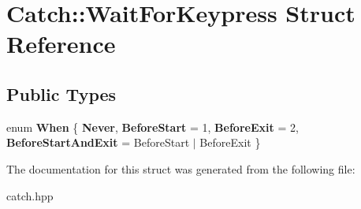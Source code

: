 \hypertarget{structCatch_1_1WaitForKeypress}{}\section{Catch\+::Wait\+For\+Keypress Struct Reference}
\label{structCatch_1_1WaitForKeypress}
\subsection*{Public Types}
\begin{DoxyCompactItemize}
\item 
\mbox{\label{structCatch_1_1WaitForKeypress_a2e8c4369d0a605d64e3e83b5af3399ba}} 
enum {\bfseries When} \{ {\bfseries Never}, 
{\bfseries Before\+Start} = 1, 
{\bfseries Before\+Exit} = 2, 
{\bfseries Before\+Start\+And\+Exit} = Before\+Start $\vert$ Before\+Exit
 \}
\end{DoxyCompactItemize}


The documentation for this struct was generated from the following file\+:\begin{DoxyCompactItemize}
\item 
catch.\+hpp\end{DoxyCompactItemize}
